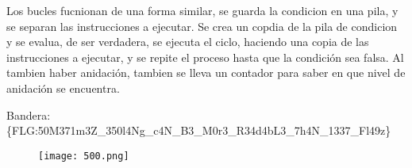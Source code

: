 \documentclass{article}
\begin{document}
Los bucles fucnionan de una forma similar, se guarda la condicion en una pila, y se separan las instrucciones a ejecutar. Se crea un copdia de la pila de condicion y se evalua, de ser verdadera, se ejecuta el ciclo, haciendo una copia de las instrucciones a ejecutar, y se repite el proceso hasta que la condición sea falsa. Al tambien haber anidación, tambien se lleva un contador para saber en que nivel de anidación se encuentra.


Bandera: \{FLG:50M371m3Z\_350l4Ng\_c4N\_B3\_M0r3\_R34d4bL3\_7h4N\_1337\_Fl49z\}
\begin{figure}[H]
  \centering
  \texttt{[image: 500.png]}
  \caption{}
\end{figure}
\end{document}

